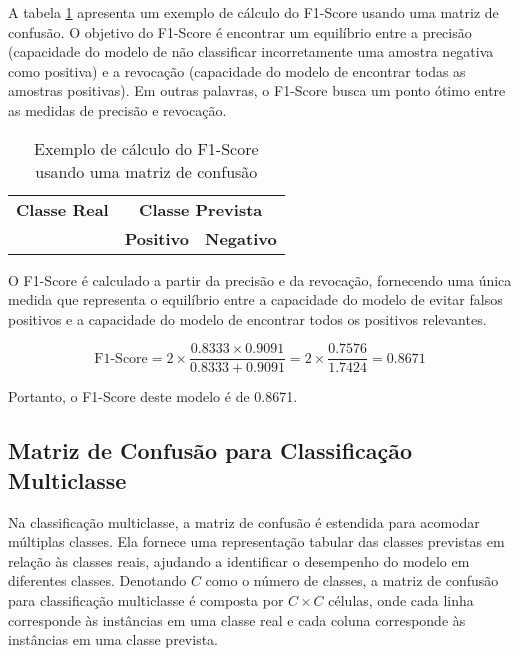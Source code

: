 A tabela \ref{tab:exemplo_f1score} apresenta um exemplo de cálculo do F1-Score usando uma matriz de confusão. O objetivo do F1-Score é encontrar um equilíbrio entre a precisão (capacidade do modelo de não classificar incorretamente uma amostra negativa como positiva) e a revocação (capacidade do modelo de encontrar todas as amostras positivas). Em outras palavras, o F1-Score busca um ponto ótimo entre as medidas de precisão e revocação.

\begin{table}[h]
\centering
\caption{Exemplo de cálculo do F1-Score usando uma matriz de confusão}
\label{tab:exemplo_f1score}
\begin{tabular}{c|cc}
\multicolumn{1}{c}{\textbf{Classe Real}} & \multicolumn{2}{c}{\textbf{Classe Prevista}} \\ \cline{2-3}
\multicolumn{1}{c}{} & \textbf{Positivo}  & \textbf{Negativo} \\ \hline
\end{tabular}
\end{table}

O F1-Score é calculado a partir da precisão e da revocação, fornecendo uma única medida que representa o equilíbrio entre a capacidade do modelo de evitar falsos positivos e a capacidade do modelo de encontrar todos os positivos relevantes.

\[
\text{F1-Score} = 2 \times \frac{0.8333 \times 0.9091}{0.8333 + 0.9091} = 2 \times \frac{0.7576}{1.7424} = 0.8671
\]

Portanto, o F1-Score deste modelo é de 0.8671.

\subsection{Matriz de Confusão para Classificação Multiclasse}

Na classificação multiclasse, a matriz de confusão é estendida para acomodar múltiplas classes. Ela fornece uma representação tabular das classes previstas em relação às classes reais, ajudando a identificar o desempenho do modelo em diferentes classes. Denotando \(C\) como o número de classes, a matriz de confusão para classificação multiclasse é composta por \(C \times C\) células, onde cada linha corresponde às instâncias em uma classe real e cada coluna corresponde às instâncias em uma classe prevista.

